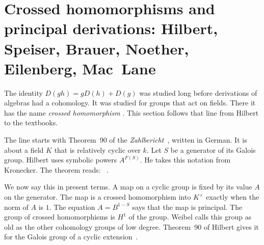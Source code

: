 \section[Crossed homomorphisms and principal derivations: Hilbert, Speiser, Brauer, Noether, Eilenberg, Mac~Lane][Crossed homomorphisms]{Crossed homomorphisms and principal derivations: Hilbert, Speiser, Brauer, Noether, Eilenberg, Mac~Lane}\label{sec:origins:crossed-homomorphisms}

The identity $D(gh) = gD(h) + D(g)$ was studied long before derivations of
algebras had a cohomology. It was studied for groups that act on fields.
There it has the name \emph{crossed homomorphism} \cite[Definition, p.~516]{Weibel1994}. This section follows that
line from Hilbert to the textbooks.

The line starts with Theorem~90 of the \emph{Zahlbericht}~\cite{Hilbert1897}, written in German.
It is about a field $K$ that is relatively cyclic over $k$. Let $S$ be a
generator of its Galois group. Hilbert uses symbolic powers $A^{F(S)}$. He
takes this notation from Kronecker. The theorem reads: ~\cite[\S 54, Satz~90, p.~272]{Hilbert1897}.

We now say this in present terms. A map on a cyclic group is fixed by its
value $A$ on the generator. The map is a crossed homomorphism into
$K^{\times}$ exactly when the norm of $A$ is $1$. The equation $A = B^{1-S}$
says that the map is principal. The group of crossed homomorphisms is $H^1$
of the group. Weibel calls this group as old as the other cohomology groups
of low degree. Theorem~90 of Hilbert gives it for the Galois group of a
cyclic extension~\cite[p.~806]{Weibel1999History}.

